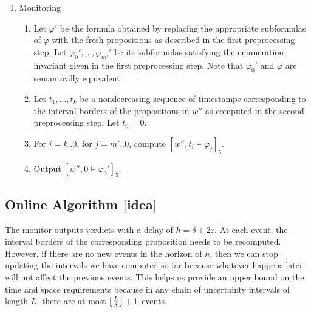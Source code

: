 \documentclass[envcountsame, runningheads]{llncs}
\newcommand{\rednote}[2][]{{\todo[color=magenta!80,size=\footnotesize,#1]{\normalcolor\normalfont#2}}}
\newcommand{\LTLo}{\ensuremath{\bigcirc}}
\let\LTLnext\LTLo
\def\until{\,\mathcal{U}\,}
\newcommand{\?}{\text{?}}
\DeclarePairedDelimiter\floor{\lfloor}{\rfloor}
\begin{document}
\begin{enumerate}
		\item Monitoring
		\begin{enumerate}[label=\arabic*.]
			\item Let $\varphi'$ be the formula obtained by replacing the appropriate subformulas of $\varphi$ with the fresh propositions as described in the first preprocessing step. Let $\varphi_0', \ldots, \varphi_{m'}'$ be its subformulas satisfying the enumeration invariant given in the first preprocessing step. Note that $\varphi_0'$  and $\varphi$ are semantically equivalent. %
			\item Let $t_1, \ldots, t_k$ be a nondecreasing sequence of timestamps corresponding to the interval borders of the propositions in $w''$ as computed in the second preprocessing step. Let $t_0 = 0$.
			\item For $i = k .. 0$, for $j = m' .. 0$, compute $[w'', t_i \models \varphi_j]_5$.
			\item Output $[w'',0 \models \varphi_0']_5$.
		\end{enumerate}
	\end{enumerate}
	
	

	
	\subsection*{Online Algorithm [idea]}
	The monitor outputs verdicts with a delay of $h = \delta + 2\varepsilon$.
	At each event, the interval borders of the corresponding proposition needs to be recomputed.
	However, if there are no new events in the horizon of $h$, then we can stop updating the intervals we have computed so far because whatever happens later will not affect the previous events.
	This helps us provide an upper bound on the time and space requirements because in any chain of uncertainty intervals of length $L$, there are at most $\floor{\frac{L}{\delta}} + 1$ events. \rednote{TODO: Clarify this.}
		
\end{document}
